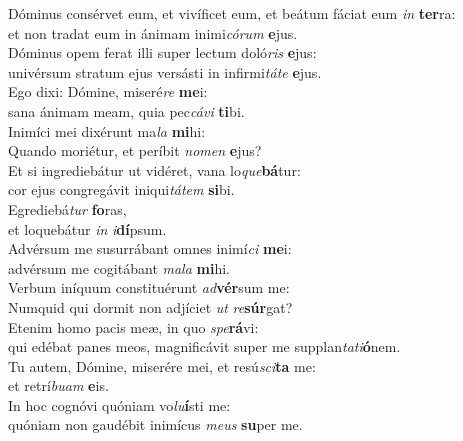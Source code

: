 \evenverse Dóminus consérvet eum, et vivíficet eum, et beátum fáciat eum \textit{in} \textbf{ter}ra:~\*\\
\evenverse et non tradat eum in ánimam inimi\textit{có}\textit{rum} \textbf{e}jus.\\
\oddverse Dóminus opem ferat illi super lectum doló\textit{ris} \textbf{e}jus:~\*\\
\oddverse univérsum stratum ejus versásti in infirmi\textit{tá}\textit{te} \textbf{e}jus.\\
\evenverse Ego dixi: Dómine, miseré\textit{re} \textbf{me}i:~\*\\
\evenverse sana ánimam meam, quia pec\textit{cá}\textit{vi} \textbf{ti}bi.\\
\oddverse Inimíci mei dixérunt ma\textit{la} \textbf{mi}hi:~\*\\
\oddverse Quando moriétur, et períbit \textit{no}\textit{men} \textbf{e}jus?\\
\evenverse Et si ingrediebátur ut vidéret, vana lo\textit{que}\textbf{bá}tur:~\*\\
\evenverse cor ejus congregávit iniqui\textit{tá}\textit{tem} \textbf{si}bi.\\
\oddverse Egrediebá\textit{tur} \textbf{fo}ras,~\*\\
\oddverse et loquebátur \textit{in} \textit{i}\textbf{dí}psum.\\
\evenverse Advérsum me susurrábant omnes inimí\textit{ci} \textbf{me}i:~\*\\
\evenverse advérsum me cogitábant \textit{ma}\textit{la} \textbf{mi}hi.\\
\oddverse Verbum iníquum constituérunt \textit{ad}\textbf{vér}sum me:~\*\\
\oddverse Numquid qui dormit non adjíciet \textit{ut} \textit{re}\textbf{súr}gat?\\
\evenverse Etenim homo pacis meæ, in quo \textit{spe}\textbf{rá}vi:~\*\\
\evenverse qui edébat panes meos, magnificávit super me supplan\textit{ta}\textit{ti}\textbf{ó}nem.\\
\oddverse Tu autem, Dómine, miserére mei, et resú\textit{sci}\textbf{ta} me:~\*\\
\oddverse et retrí\textit{bu}\textit{am} \textbf{e}is.\\
\evenverse In hoc cognóvi quóniam vo\textit{lu}\textbf{í}sti me:~\*\\
\evenverse quóniam non gaudébit inimícus \textit{me}\textit{us} \textbf{su}per me.\\
